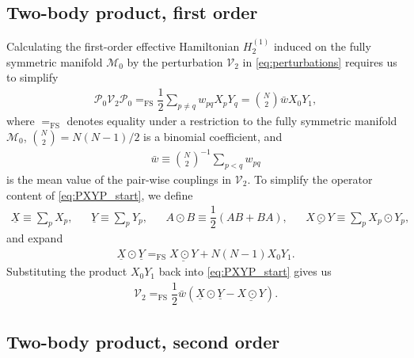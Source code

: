\documentclass[nofootinbib,notitlepage,11pt]{revtex4-2}
\newcommand{\f}[2]{\dfrac{#1}{#2}} %
\newcommand{\p}[1]{\left(#1\right)} %
\newcommand{\1}{\mathds{1}}
\newcommand{\M}{\mathcal{M}}
\renewcommand{\P}{\mathcal{P}}
\newcommand{\V}{\mathcal{V}}
\newcommand{\EQFS}{=_{\text{FS}}}
\newcommand{\col}{\underline}
\begin{document}
\subsection{Two-body product, first order}
\label{sec:PXYP}

Calculating the first-order effective Hamiltonian $H_2^{(1)}$ induced
on the fully symmetric manifold $\M_0$ by the perturbation $\V_2$ in
\eqref{eq:perturbations} requires us to simplify
\begin{align}
  \P_0 \V_2 \P_0
  \EQFS \f12 \sum_{p\ne q} w_{pq} X_p Y_q
  = {N\choose 2} \bar w X_0 Y_1,
  \label{eq:PXYP_start}
\end{align}
where $\EQFS$ denotes equality under a restriction to the fully
symmetric manifold $\M_0$, ${N\choose2}=N\p{N-1}/2$ is a binomial
coefficient, and
\begin{align}
  \bar w \equiv {N\choose 2}^{-1} \sum_{p<q} w_{pq}
\end{align}
is the mean value of the pair-wise couplings in $\V_2$.  To simplify
the operator content of \eqref{eq:PXYP_start}, we define
\begin{align}
  \col{X} \equiv \sum_p X_p,
  &&
  \col{Y} \equiv \sum_p Y_p,
  &&
  A \odot B \equiv \f12\p{AB+BA},
  &&
  \col{X\odot Y} \equiv \sum_p X_p \odot Y_p,
\end{align}
and expand
\begin{align}
  \col{X}\odot\col{Y} \EQFS \col{X\odot Y} + N\p{N-1} X_0 Y_1.
\end{align}
Substituting the product $X_0 Y_1$ back into \eqref{eq:PXYP_start}
gives us
\begin{align}
  \V_2 \EQFS \f12 \bar w \p{\col{X}\odot\col{Y} - \col{X\odot Y}}.
\end{align}

\subsection{Two-body product, second order}
\label{sec:PXYXYP}
\end{document}
